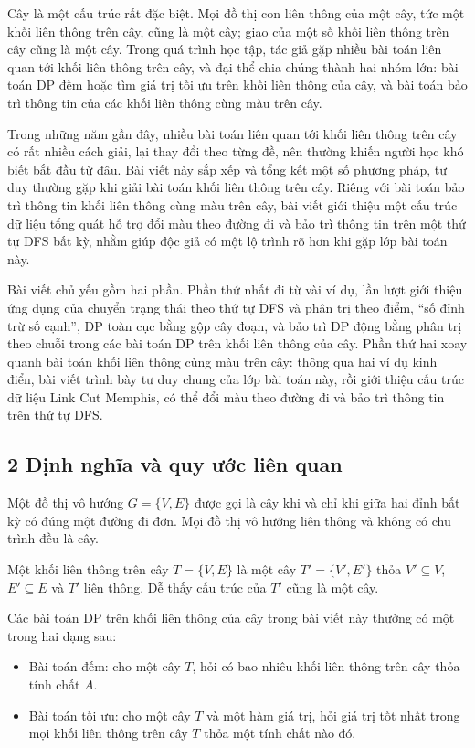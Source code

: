 \documentclass[11pt]{article}
\begin{document}
Cây là một cấu trúc rất đặc biệt. Mọi đồ thị con liên thông của một cây, tức một
khối liên thông trên cây, cũng là một cây; giao của một số khối liên thông trên
cây cũng là một cây. Trong quá trình học tập, tác giả gặp nhiều bài toán liên
quan tới khối liên thông trên cây, và đại thể chia chúng thành hai nhóm lớn:
bài toán DP đếm hoặc tìm giá trị tối ưu trên khối liên thông của cây, và bài
toán bảo trì thông tin của các khối liên thông cùng màu trên cây.

Trong những năm gần đây, nhiều bài toán liên quan tới khối liên thông trên cây
có rất nhiều cách giải, lại thay đổi theo từng đề, nên thường khiến người học
khó biết bắt đầu từ đâu. Bài viết này sắp xếp và tổng kết một số phương pháp,
tư duy thường gặp khi giải bài toán khối liên thông trên cây. Riêng với bài
toán bảo trì thông tin khối liên thông cùng màu trên cây, bài viết giới thiệu
một cấu trúc dữ liệu tổng quát hỗ trợ đổi màu theo đường đi và bảo trì thông tin
trên một thứ tự DFS bất kỳ, nhằm giúp độc giả có một lộ trình rõ hơn khi gặp
lớp bài toán này.

Bài viết chủ yếu gồm hai phần. Phần thứ nhất đi từ vài ví dụ, lần lượt giới
thiệu ứng dụng của chuyển trạng thái theo thứ tự DFS và phân trị theo điểm,
``số đỉnh trừ số cạnh'', DP toàn cục bằng gộp cây đoạn, và bảo trì DP động bằng
phân trị theo chuỗi trong các bài toán DP trên khối liên thông của cây. Phần
thứ hai xoay quanh bài toán khối liên thông cùng màu trên cây: thông qua hai ví
dụ kinh điển, bài viết trình bày tư duy chung của lớp bài toán này, rồi giới
thiệu cấu trúc dữ liệu Link Cut Memphis, có thể đổi màu theo đường đi và bảo
trì thông tin trên thứ tự DFS.

\subsection*{2 Định nghĩa và quy ước liên quan}

Một đồ thị vô hướng \(G=\{V,E\}\) được gọi là cây khi và chỉ khi giữa hai đỉnh
bất kỳ có đúng một đường đi đơn. Mọi đồ thị vô hướng liên thông và không có chu
trình đều là cây.

Một khối liên thông trên cây \(T=\{V,E\}\) là một cây
\(T'=\{V',E'\}\) thỏa \(V'\subseteq V\), \(E'\subseteq E\) và \(T'\) liên thông.
Dễ thấy cấu trúc của \(T'\) cũng là một cây.

Các bài toán DP trên khối liên thông của cây trong bài viết này thường có một
trong hai dạng sau:
\begin{itemize}
  \item Bài toán đếm: cho một cây \(T\), hỏi có bao nhiêu khối liên thông trên
  cây thỏa tính chất \(A\).
  \item Bài toán tối ưu: cho một cây \(T\) và một hàm giá trị, hỏi giá trị tốt
  nhất trong mọi khối liên thông trên cây \(T\) thỏa một tính chất nào đó.
\end{itemize}
\end{document}
